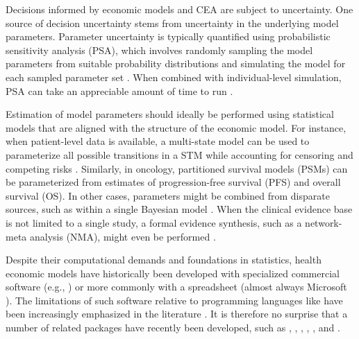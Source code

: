 \documentclass[article, nojss]{jss}\usepackage[]{graphicx}\usepackage[]{color}
\begin{document}
Decisions informed by economic models and CEA are subject to uncertainty. One source of decision uncertainty stems from uncertainty in the underlying model parameters. Parameter uncertainty is typically quantified using probabilistic sensitivity analysis (PSA), which involves randomly sampling the model parameters from suitable probability distributions and simulating the model for each sampled parameter set \citep{claxton2005probabilistic}. When combined with individual-level simulation, PSA can take an appreciable amount of time to run \citep{ohagan2007monte}.

Estimation of model parameters should ideally be performed using statistical models that are aligned with the structure of the economic model. For instance, when patient-level data is available, a multi-state model can be used to parameterize all possible transitions in a STM while accounting for censoring and competing risks \citep{williams2017cost}. Similarly, in oncology, partitioned survival models (PSMs) can be parameterized from estimates of progression-free survival (PFS) and overall survival (OS). In other cases, parameters might be combined from disparate sources, such as within a single Bayesian model \citep{baio2012bayesian}. When the clinical evidence base is not limited to a single study, a formal evidence synthesis, such as a network-meta analysis (NMA), might even be performed \citep{dias2018network}.

Despite their computational demands and foundations in statistics, health economic models have historically been developed with specialized commercial software (e.g., ) or more commonly with a spreadsheet (almost always Microsoft ). The limitations of such software relative to programming languages like  have been increasingly emphasized in the literature \citep{baio2017simple, incerti2019r, jalal2017overview}. It is therefore no surprise that a number of related  packages have recently been developed, such as  \citep{baio2017bayesian},  \citep{strong2014estimating},  \citep{alarid2018dampack},  \citep{heath2018efficient},  \citep{baio2020survhe}, and  \citep{filipovic2017markov}. 
\end{document}
